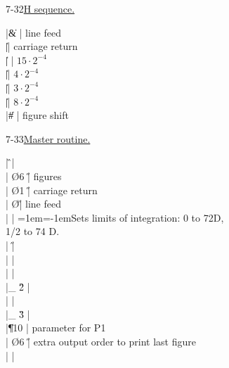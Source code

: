\documentclass[11pt]{article}
\newcommand{\sect}[2]{\par\vspace{\baselineskip}#1\quad\uline{#2}}
\newcommand{\hang}{\leftskip=1em\parindent=-1em}
\begin{document}
\sect{7-32}{H sequence.}
\newcommand{\eindent}{\rlap{H}{\phantom{$\mbox{Start}\to{}$}}}
\begin{edsac}{0}
    |\| \&      \F | line feed          \\
    |\| \@      \F | carriage return    \\
    |\|  \F | $15\cdot2^{-4}$    \\
    |\| \R      \F | $4\cdot2^{-4}$     \\
    |\| \E      \F | $3\cdot2^{-4}$     \\
    |\| \I      \F | $8\cdot2^{-4}$     \\
    |\| \#      \F | figure shift
\end{edsac}

\sect{7-33}{Master routine.}
\begin{edsac}{0}
\nonum  |   \G     \K |                                     \\
        |   \O   6 \H | figures                             \\
        |   \O   1 \H | carriage return                     \\
        |   \O     \H | line feed                           \\
        |    \D | %
                        {\hang Sets limits of integration: 0 to
                         72D,\\1/2 to 74 D.\hspace{-15em}}  \\
        |    \H |                                     \\
        |    \D |                                     \\
        |    \@ |       \\
        |\_ \G   2 \! |                                     \\
        |    \@ |       \\
        |\_ \G   3 \! |                                     \\
        |\| \P  10 \F | parameter for P1                    \\
        |   \O   6 \H | extra output order to print last figure \\
        |   \Z     \F |
\end{edsac}
\end{document}
